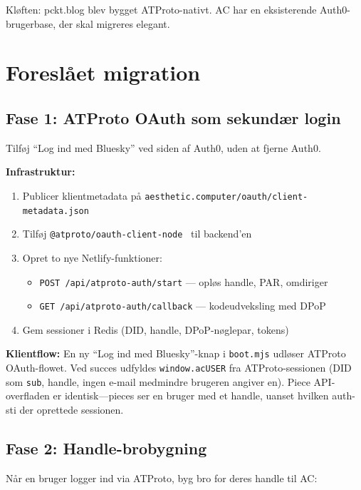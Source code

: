 \documentclass[10pt,letterpaper,twocolumn]{article}
\begin{document}
Kløften: pckt.blog blev bygget ATProto-nativt. AC har en eksisterende Auth0-brugerbase, der skal migreres elegant.


\section{Foreslået migration}
\label{sec:migration}

\subsection{Fase 1: ATProto OAuth som sekundær login}

Tilføj ``Log ind med Bluesky'' ved siden af Auth0, uden at fjerne Auth0.

\textbf{Infrastruktur:}
\begin{enumerate}
  \item Publicer klientmetadata på \texttt{aesthetic.computer/oauth/client-metadata.json}
  \item Tilføj \texttt{@atproto/oauth-client-node}~\citep{npmAtprotoOauth} til backend'en
  \item Opret to nye Netlify-funktioner:
    \begin{itemize}
      \item \texttt{POST /api/atproto-auth/start} --- opløs handle, PAR, omdiriger
      \item \texttt{GET /api/atproto-auth/callback} --- kodeudveksling med DPoP
    \end{itemize}
  \item Gem sessioner i Redis (DID, handle, DPoP-nøglepar, tokens)
\end{enumerate}

\textbf{Klientflow:} En ny ``Log ind med Bluesky''-knap i \texttt{boot.mjs} udløser ATProto OAuth-flowet. Ved succes udfyldes \texttt{window.acUSER} fra ATProto-sessionen (DID som \texttt{sub}, handle, ingen e-mail medmindre brugeren angiver en). Piece API-overfladen er identisk---pieces ser en bruger med et handle, uanset hvilken auth-sti der oprettede sessionen.

\subsection{Fase 2: Handle-brobygning}

Når en bruger logger ind via ATProto, byg bro for deres handle til AC:
\end{document}
